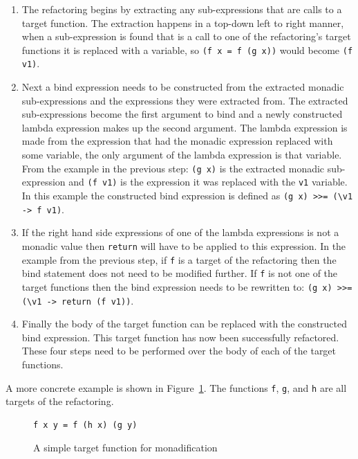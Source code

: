 \begin{enumerate}
\item The refactoring begins by extracting any sub-expressions that are calls to a target function. The extraction happens in a top-down left to right manner, when a sub-expression is found that is a call to one of the refactoring's target functions it is replaced with a variable, so  \texttt{(f x = f (g x))} would become \texttt{(f v1)}.

\item Next a bind expression needs to be constructed from the extracted monadic sub-expressions and the expressions they were extracted from. The extracted sub-expressions become the first argument to bind and a newly constructed lambda expression makes up the second argument. The lambda expression is made from the expression that had the monadic expression replaced with some variable, the only argument of the lambda expression is that variable. From the example in the previous step: \texttt{(g x)} is the extracted monadic sub-expression and \texttt{(f v1)} is the expression it was replaced with the \texttt{v1} variable. In this example the constructed bind expression is defined as \texttt{(g x) >>= (\textbackslash v1 -> f v1)}.

\item If the right hand side expressions of one of the lambda expressions is not a monadic value then \texttt{return} will have to be applied to this expression. In the example from the previous step, if \texttt{f} is a target of the refactoring then the bind statement does not need to be modified further. If \texttt{f} is not one of the target functions then the bind expression needs to be rewritten to: \texttt{(g x) >>= (\textbackslash v1 -> return (f v1))}.

\item Finally the body of the target function can be replaced with the constructed bind expression. This target function has now been successfully refactored. These four steps need to be performed over the body of each of the target functions. 
\end{enumerate}

A more concrete example is shown in Figure~\ref{simpleMon}. The functions \texttt{f}, \texttt{g}, and \texttt{h} are all targets of the refactoring.

\begin{figure}[t]
\begin{lstlisting}
f x y = f (h x) (g y)
\end{lstlisting}
\caption{A simple target function for monadification}
\label{simpleMon}
\end{figure}  


